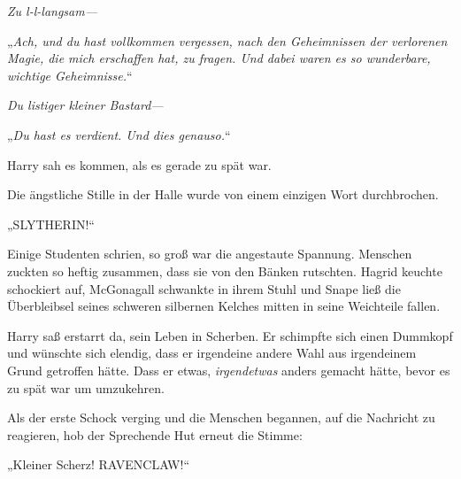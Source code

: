 \emph{Zu l-l-langsam—}

„\emph{Ach, und du hast vollkommen vergessen, nach den Geheimnissen der verlorenen Magie, die mich erschaffen hat, zu fragen. Und dabei waren es so wunderbare, wichtige Geheimnisse.}“

\emph{Du listiger kleiner \emph{Bastard}—}

„\emph{Du hast es verdient. Und dies genauso.}“

Harry sah es kommen, als es gerade zu spät war.

Die ängstliche Stille in der Halle wurde von einem einzigen Wort durchbrochen.

„SLYTHERIN!“

Einige Studenten schrien, so groß war die angestaute Spannung. Menschen zuckten so heftig zusammen, dass sie von den Bänken rutschten. Hagrid keuchte schockiert auf, McGonagall schwankte in ihrem Stuhl und Snape ließ die Überbleibsel seines schweren silbernen Kelches mitten in seine Weichteile fallen.

Harry saß erstarrt da, sein Leben in Scherben. Er schimpfte sich einen Dummkopf und wünschte sich elendig, dass er irgendeine andere Wahl aus irgendeinem Grund getroffen hätte. Dass er etwas, \emph{irgendetwas} anders gemacht hätte, bevor es zu spät war um umzukehren.

Als der erste Schock verging und die Menschen begannen, auf die Nachricht zu reagieren, hob der Sprechende Hut erneut die Stimme:

„Kleiner Scherz! RAVENCLAW!“

